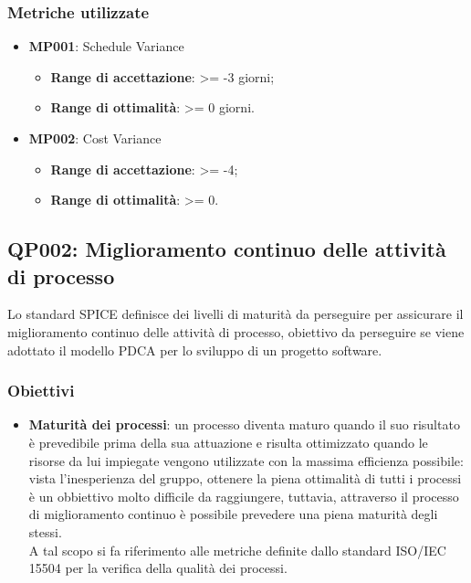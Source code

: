 \subsubsection{Metriche utilizzate}
\begin{itemize}
	\item \textbf{MP001}: Schedule Variance
	\begin{itemize}
		\item \textbf{Range di accettazione}: >= -3 giorni;
		\item \textbf{Range di ottimalità}: >= 0 giorni.
	\end{itemize}
	\item \textbf{MP002}: Cost Variance
	\begin{itemize}
		\item \textbf{Range di accettazione}: >= -4;
		\item \textbf{Range di ottimalità}: >= 0.
	\end{itemize}
\end{itemize}


\subsection{QP002: Miglioramento continuo delle attività di processo}\label{pro2}
Lo standard SPICE definisce dei livelli di maturità da perseguire per assicurare il miglioramento continuo delle attività di processo, obiettivo da perseguire se viene adottato il modello PDCA per lo sviluppo di un progetto software.
\subsubsection{Obiettivi}
\begin{itemize}
	\item \textbf{Maturità dei processi}: un processo diventa maturo quando il suo risultato è prevedibile prima della sua attuazione e risulta ottimizzato quando le risorse da lui impiegate vengono utilizzate con la massima efficienza possibile: vista l'inesperienza del gruppo, ottenere la piena ottimalità di tutti i processi è un obbiettivo molto difficile da raggiungere, tuttavia, attraverso il processo di miglioramento continuo è possibile prevedere una piena maturità degli stessi.\\
	A tal scopo si fa riferimento alle metriche definite dallo standard ISO/IEC 15504 per la verifica della qualità dei processi.
\end{itemize}

